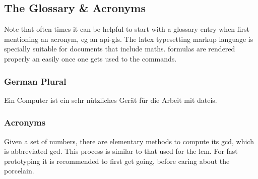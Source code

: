 \subsection{The Glossary \& Acronyms}
Note that often times it can be helpful to start with a glossary-entry when first mentioning an acronym, \acrshort{eg} an \Gls{api-gls}.
The \Gls{latex} typesetting markup language is specially suitable for documents that include \gls{maths}.
\Glspl{formula} are rendered properly an easily once one gets used to the commands.

\subsubsection{German Plural}
Ein Computer ist ein sehr nützliches Gerät für die Arbeit mit \Glspl{datei}.

\subsubsection{Acronyms}
Given a set of numbers, there are elementary methods to compute its \acrlong{gcd}, which is abbreviated \acrshort{gcd}.
This process is similar to that used for the \acrfull{lcm}.
For fast prototyping it is recommended to first get  going, before caring about the porcelain.
